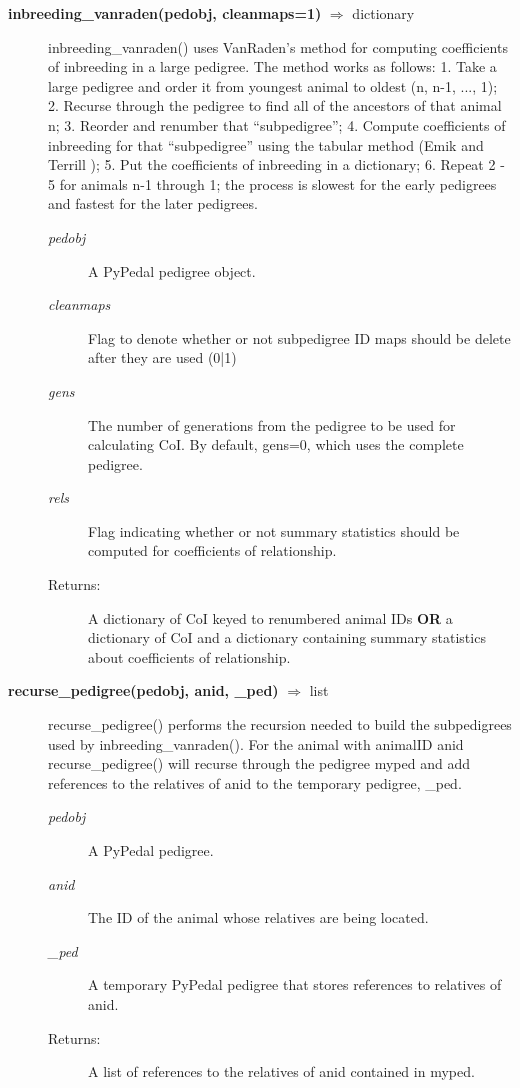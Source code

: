 \begin{description}
\item[\textbf{inbreeding\_vanraden(pedobj, cleanmaps=1)} $\Rightarrow$ dictionary] 
inbreeding\_vanraden() uses VanRaden's \cite{VanRaden1992a} method for computing coefficients of inbreeding in a large pedigree. The method works as follows: 1. Take a large pedigree and order it from youngest animal to oldest (n, n-1, ..., 1); 2. Recurse through the pedigree to find all of the ancestors of that animal n; 3. Reorder and renumber that ``subpedigree''; 4. Compute coefficients of inbreeding for that ``subpedigree'' using the tabular method (Emik and Terrill \cite{Emik1949a}); 5. Put the coefficients of inbreeding in a dictionary; 6. Repeat 2 - 5 for animals n-1 through 1; the process is slowest for the early pedigrees and fastest for the later pedigrees.
\begin{description}
\item[\emph{pedobj}] A PyPedal pedigree object.
\item[\emph{cleanmaps}] Flag to denote whether or not subpedigree ID maps should be delete after they are used (0|1)
\item[\emph{gens}] The number of generations from the pedigree to be used for calculating CoI.  By default, gens=0, which uses the complete pedigree.
\item[\emph{rels}] Flag indicating whether or not summary statistics should be computed for coefficients of relationship.
\item[Returns:] A dictionary of CoI keyed to renumbered animal IDs \textbf{OR} a dictionary of CoI and a dictionary containing summary statistics about coefficients of relationship.
\end{description}

\item[\textbf{recurse\_pedigree(pedobj, anid, \_ped)} $\Rightarrow$ list] 
recurse\_pedigree() performs the recursion needed to build the subpedigrees used by inbreeding\_vanraden(). For the animal with animalID anid recurse\_pedigree() will recurse through the pedigree myped and add references to the relatives of anid to the temporary pedigree, \_ped.
\begin{description}
\item[\emph{pedobj}] A PyPedal pedigree.
\item[\emph{anid}] The ID of the animal whose relatives are being located.
\item[\emph{\_ped}] A temporary PyPedal pedigree that stores references to relatives of anid.
\item[Returns:] A list of references to the relatives of anid contained in myped.
\end{description}


\end{description}
